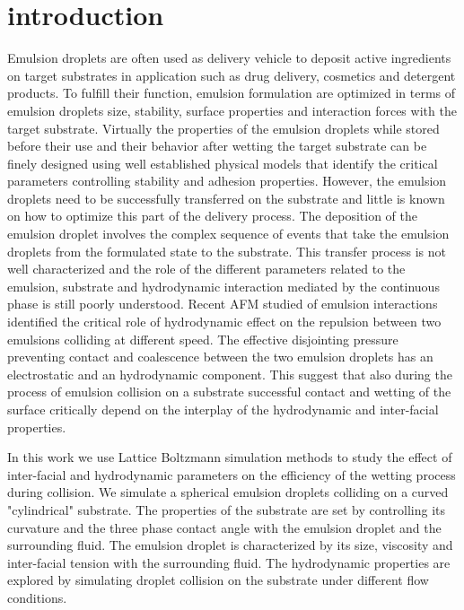 \documentclass{article}
\begin{document}
\section{introduction}
Emulsion droplets are often used as delivery vehicle to deposit active ingredients on target substrates in application such as drug delivery, cosmetics and detergent products. To fulfill their function, emulsion formulation are optimized in terms of emulsion droplets size, stability, surface properties and interaction forces with the target substrate. Virtually the properties of the emulsion droplets while stored before their use and their behavior after wetting the target substrate can be finely designed using well established physical models that identify the critical parameters controlling stability and adhesion properties. However, the emulsion droplets need to be successfully transferred on the substrate and little is known on how to optimize this part of the delivery process. The deposition of the emulsion droplet involves the complex sequence of events that take the emulsion droplets from the formulated state to the substrate.  This transfer process is not well characterized and the role of the different parameters related to the emulsion, substrate and hydrodynamic interaction mediated by the continuous phase is still poorly understood. Recent AFM studied of emulsion interactions identified the critical role of hydrodynamic effect on the repulsion between two emulsions colliding at different speed. The effective disjointing pressure preventing contact and coalescence between the two emulsion droplets has an electrostatic and an hydrodynamic component. This suggest that also during the process of emulsion collision on a substrate successful contact and wetting of the surface critically depend on the interplay of the hydrodynamic and inter-facial properties. 

In this work we use Lattice Boltzmann simulation methods to study the effect of inter-facial and hydrodynamic parameters on the efficiency of the wetting process during collision. We simulate a spherical emulsion droplets colliding on a curved "cylindrical" substrate. The properties of the substrate are set by controlling its curvature and the three phase contact angle with the emulsion droplet and the surrounding fluid. The emulsion droplet is characterized by its size, viscosity and inter-facial tension with the surrounding fluid. The hydrodynamic properties are explored by simulating droplet collision on the substrate under different flow conditions. 
\end{document}
